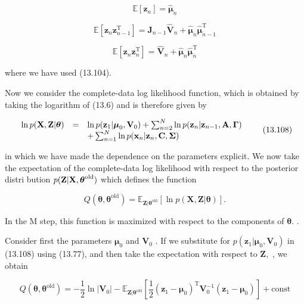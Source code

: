 \documentclass[
  10
]{article}
\begin{document}
\[
\mathbb {E} \left[ \mathbf {z} _ {n} \right] = \widehat {\pmb {\mu}} _ {n}\tag{13.105}
\]

\[
{\mathbb {E} \left[ \mathbf {z} _ {n} \mathbf {z} _ {n - 1} ^ {\mathrm{T}} \right]} = {\mathbf {J} _ {n - 1} \widehat {\mathbf {V}} _ {n} + \widehat {\pmb {\mu}} _ {n} \widehat {\pmb {\mu}} _ {n - 1} ^ {\mathrm{T}}}\tag{13.106}
\]

\[
{\mathbb {E} \left[ \mathbf {z} _ {n} \mathbf {z} _ {n} ^ {\mathrm{T}} \right]} = {\widehat {\mathbf {V}} _ {n} + \widehat {\pmb {\mu}} _ {n} \widehat {\pmb {\mu}} _ {n} ^ {\mathrm{T}}}\tag{13.107}
\]

where we have used (13.104).

Now we consider the complete-data log likelihood function, which is
obtained by taking the logarithm of (13.6) and is therefore given by

\[
\begin{array}{r c l} \ln p (\mathbf {X}, \mathbf {Z} | \boldsymbol {\theta}) & = & \ln p (\mathbf {z} _ {1} | \boldsymbol {\mu} _ {0}, \mathbf {V} _ {0}) + \sum_ {n = 2} ^ {N} \ln p (\mathbf {z} _ {n} | \mathbf {z} _ {n - 1}, \mathbf {A}, \boldsymbol {\Gamma}) \\ & & + \sum_ {n = 1} ^ {N} \ln p (\mathbf {x} _ {n} | \mathbf {z} _ {n}, \mathbf {C}, \boldsymbol {\Sigma}) \end{array}\tag{13.108}
\]

in which we have made the dependence on the parameters explicit. We now
take the expectation of the complete-data log likelihood with respect to
the posterior distri bution
\(p ( { \bf Z } | { \bf X } , \boldsymbol { \theta } ^ { \mathrm { o l d } } )\)
which defines the function

\[
Q (\boldsymbol {\theta}, \boldsymbol {\theta} ^ {\mathrm{old}}) = \mathbb {E} _ {\mathbf {Z} | \boldsymbol {\theta} ^ {\mathrm{old}}} \left[ \ln p (\mathbf {X}, \mathbf {Z} | \boldsymbol {\theta}) \right].\tag{13.109}
\]

In the M step, this function is maximized with respect to the components
of \(\pmb { \theta } .\) .

Consider first the parameters \(\pmb { \mu } _ { 0 }\) and
\(\mathbf { V } _ { 0 }\) . If we substitute for
\(p ( \mathbf { z } _ { 1 } | \boldsymbol { \mu } _ { 0 } , \mathbf { V } _ { 0 } )\)
in (13.108) using (13.77), and then take the expectation with respect to
\(\mathbf { Z } ,\) , we obtain

\[
Q (\pmb {\theta}, \pmb {\theta} ^ {\mathrm{old}}) = - \frac {1}{2} \ln | \mathbf {V} _ {0} | - \mathbb {E} _ {\mathbf {Z} | \pmb {\theta} ^ {\mathrm{old}}} \left[ \frac {1}{2} (\mathbf {z} _ {1} - \pmb {\mu} _ {0}) ^ {\mathrm{T}} \mathbf {V} _ {0} ^ {- 1} (\mathbf {z} _ {1} - \pmb {\mu} _ {0}) \right] + \mathrm{const}
\]
\end{document}
